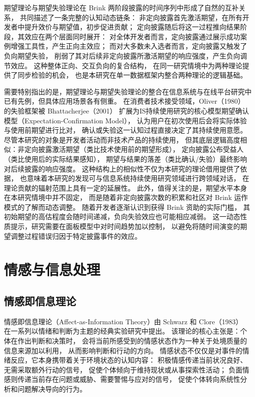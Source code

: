 \documentclass[
    type = master, %
    degree = professional,        %
    decl-page,  %
    twoside,                %
    fontset = fandol %
  ]{njuthesis}
\begin{document}
期望理论与期望失验理论在 Brink 两阶段披露的时间序列中形成了自然的互补关系，
共同描述了一条完整的认知动态链条：
非定向披露首先激活期望，在所有开发者中提升效价与期望值，初步促进贡献；
定向披露随后将这一过程推向结果阶段，其效应在两个层面同时展开：
对全体开发者而言，定向披露通过展示成功案例增强工具性，产生正向主效应；
而对大多数未入选者而言，定向披露又触发了负向期望失验，
削弱了其对后续非定向披露所激活期望的响应强度，产生负向调节效应。
这种整体正向、交互负向的复合结构，
在同一研究情境中为两种理论提供了同步检验的机会，
也是本研究在单一数据框架内整合两种理论的逻辑基础。

需要特别指出的是，期望理论与期望失验理论的整合在信息系统与在线平台研究中
已有先例，但具体应用场景各有侧重。
在消费者技术接受领域，Oliver（1980）的失验框架被 Bhattacherjee（2001）\cite{bhattacherjee2001understanding}
扩展为IS持续使用研究的核心模型期望确认模型（Expectation-Confirmation Model），
认为用户在初次使用后会将实际体验与使用前期望进行比对，
确认或失验这一认知过程直接决定了其持续使用意愿。
尽管本研究的对象是开发者活动而非技术产品的持续使用，
但其底层逻辑高度相似：非定向披露激活期望（类比技术使用前的期望形成），
定向披露公布受益人（类比使用后的实际结果感知），
期望与结果的落差（类比确认/失验）最终影响对后续披露的响应强度。
这种结构上的相似性不仅为本研究的理论借用提供了依据，
也意味着本研究的发现可与信息系统持续使用研究领域进行跨领域对话，
在理论贡献的辐射范围上具有一定的延展性。
此外，值得关注的是，期望水平本身在本研究情境中并不固定，
而是随着非定向披露次数的积累和社区对 Brink 运作模式的了解而动态调整。
随着开发者逐渐认识到获得 Brink 资助的实际门槛，
其初始期望的高估程度会随时间递减，负向失验效应也可能相应减弱。
这一动态性质提示，研究需要在面板模型中对时间趋势加以控制，
以避免将随时间演变的期望调整过程错误归因于特定披露事件的效应。

\section{情感与信息处理}

\subsection{情感即信息理论}

情感即信息理论（Affect-as-Information Theory）由 Schwarz 和 Clore（1983）
在一系列以情绪和判断为主题的经典实验研究中提出\cite{schwarz1983moods}。
该理论的核心主张是：个体在作出判断和决策时，
会将当前所感受到的情感状态作为一种关于处境质量的信息来源加以利用，
从而影响判断和行动的方向。
情感状态不仅仅是对事件的情绪反应，它本身携带着关于环境状态的认知内容：
积极情感传递当前状况良好、无需采取额外行动的信号，
促使个体倾向于维持现状或从事探索性活动；
负面情感则传递当前存在问题或威胁、需要警惕与应对的信号，
促使个体转向系统性分析和问题解决导向的行为。
\end{document}
